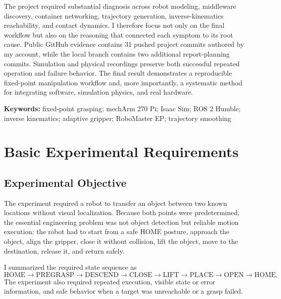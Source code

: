 \documentclass[UTF8,zihao=-4,scheme=chinese,fontset=none]{ctexart}
\begin{document}
The project required substantial diagnosis across robot modeling, middleware discovery, container networking, trajectory generation, inverse-kinematics reachability, and contact dynamics. I therefore focus not only on the final workflow but also on the reasoning that connected each symptom to its root cause. Public GitHub evidence contains 31 pushed project commits authored by my account, while the local branch contains two additional report-planning commits. Simulation and physical recordings preserve both successful repeated operation and failure behavior. The final result demonstrates a reproducible fixed-point manipulation workflow and, more importantly, a systematic method for integrating software, simulation physics, and real hardware.

\noindent\textbf{Keywords:} fixed-point grasping; mechArm 270 Pi; Isaac Sim; ROS 2 Humble; inverse kinematics; adaptive gripper; RoboMaster EP; trajectory smoothing

\clearpage
\begingroup{}\linespread{.92}\selectfont
\tableofcontents
\endgroup
\clearpage

\setcounter{page}{1}

\section{Basic Experimental Requirements}

\subsection{Experimental Objective}

The experiment required a robot to transfer an object between two known locations without visual localization. Because both points were predetermined, the essential engineering problem was not object detection but reliable motion execution: the robot had to start from a safe HOME posture, approach the object, align the gripper, close it without collision, lift the object, move to the destination, release it, and return safely.

I summarized the required state sequence as
\begin{equation}
\mathrm{HOME}\rightarrow\mathrm{PREGRASP}\rightarrow\mathrm{DESCEND}\rightarrow
\mathrm{CLOSE}\rightarrow\mathrm{LIFT}\rightarrow\mathrm{PLACE}\rightarrow
\mathrm{OPEN}\rightarrow\mathrm{HOME}.
\end{equation}
The experiment also required repeated execution, visible state or error information, and safe behavior when a target was unreachable or a grasp failed.
\end{document}
